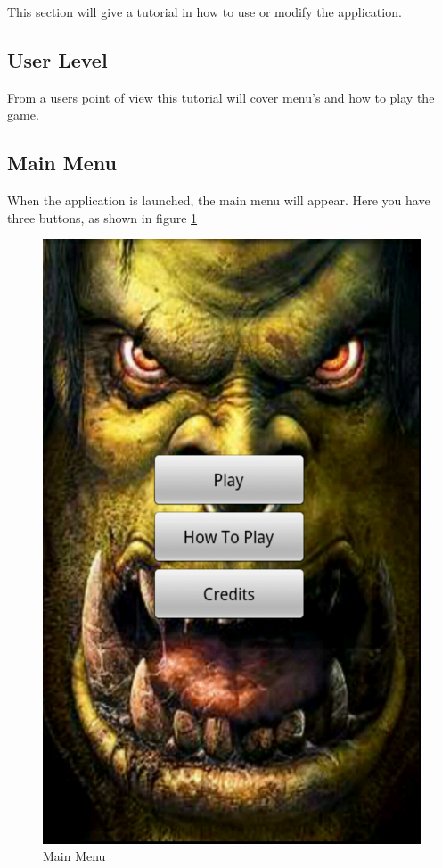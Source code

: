 This section will give a tutorial in how to use or modify the application. 

\subsection{User Level}
From a users point of view this tutorial will cover menu’s and how to play the game. 
\clearpage
\subsection{Main Menu}

When the application is launched, the main menu will appear. Here you have three buttons, as shown in figure \ref{usermanual:menu}

\begin{figure} [h]
	\center
		\includegraphics[scale=0.5]{main/figures/screenshots/menu}
		\caption{Main Menu}
		\label{usermanual:menu}
\end{figure}

